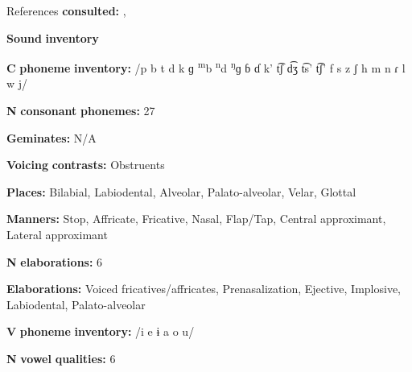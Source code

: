 \documentclass[output=paper]{langsci/langscibook}
\begin{document}
\begin{styleBody}
References \textbf{consulted:} \citet{Allison2012}, \citet{Mahamat2005}
\end{styleBody}

\begin{styleBody}
\textbf{Sound} \textbf{inventory}
\end{styleBody}

\begin{styleBody}
\textbf{C} \textbf{phoneme} \textbf{inventory:} /p b t d k ɡ \textsuperscript{m}b \textsuperscript{n}d \textsuperscript{ŋ}ɡ ɓ ɗ k’ t͡ʃ d͡ʒ t͡s’ t͡ʃ’ f s z ʃ h m n ɾ l w j/
\end{styleBody}

\begin{styleBody}
\textbf{N} \textbf{consonant} \textbf{phonemes:} 27
\end{styleBody}

\begin{styleBody}
\textbf{Geminates:} N/A
\end{styleBody}

\begin{styleBody}
\textbf{Voicing} \textbf{contrasts:} Obstruents
\end{styleBody}

\begin{styleBody}
\textbf{Places:} Bilabial, Labiodental, Alveolar, Palato-alveolar, Velar, Glottal
\end{styleBody}

\begin{styleBody}
\textbf{Manners:} Stop, Affricate, Fricative, Nasal, Flap/Tap, Central approximant, Lateral approximant
\end{styleBody}

\begin{styleBody}
\textbf{N} \textbf{elaborations:} 6
\end{styleBody}

\begin{styleBody}
\textbf{Elaborations:} Voiced fricatives/affricates, Prenasalization, Ejective, Implosive, Labiodental, Palato-alveolar
\end{styleBody}

\begin{styleBody}
\textbf{V} \textbf{phoneme} \textbf{inventory:} /i e ɨ a o u/
\end{styleBody}

\begin{styleBody}
\textbf{N} \textbf{vowel} \textbf{qualities:} 6
\end{styleBody}
\end{document}
